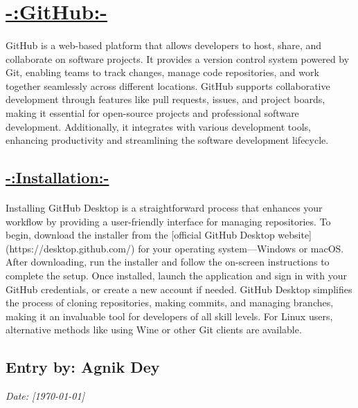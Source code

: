 \documentclass[a4paper,12pt]{article}
\begin{document}
\section*{\Huge{\underline{{-:GitHub:-}}}}
\paragraph{}{GitHub is a web-based platform that allows developers to host, share, and collaborate on software projects. It provides a version control system powered by Git, enabling teams to track changes, manage code repositories, and work together seamlessly across different locations. GitHub supports collaborative development through features like pull requests, issues, and project boards, making it essential for open-source projects and professional software development. Additionally, it integrates with various development tools, enhancing productivity and streamlining the software development lifecycle.}

\subsection*{\underline{-:Installation:-}}
\paragraph{}{Installing GitHub Desktop is a straightforward process that enhances your workflow by providing a user-friendly interface for managing repositories. To begin, download the installer from the [official GitHub Desktop website](https://desktop.github.com/) for your operating system—Windows or macOS. After downloading, run the installer and follow the on-screen instructions to complete the setup. Once installed, launch the application and sign in with your GitHub credentials, or create a new account if needed. GitHub Desktop simplifies the process of cloning repositories, making commits, and managing branches, making it an invaluable tool for developers of all skill levels. For Linux users, alternative methods like using Wine or other Git clients are available.}


\newpage
{}
\vspace{-2cm}
\subsection*{Entry by: Agnik Dey}
\textit{Date: [\today]}\\
\end{document}
